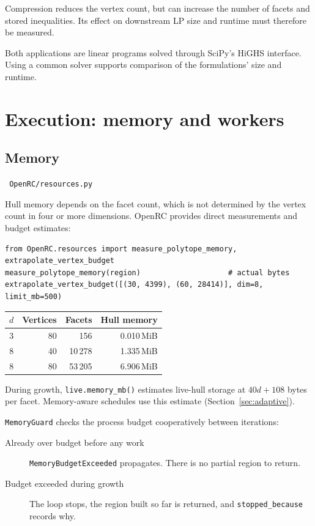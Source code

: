 \documentclass[11pt,a4paper]{report}
\newcommand{\code}[1]{\texttt{\small #1}}
\newcommand{\file}[1]{\texttt{\small\color{nbgrey} #1}}
\begin{document}
Compression reduces the vertex count, but can increase the number of facets
and stored inequalities. Its effect on downstream LP size and runtime must
therefore be measured.

Both applications are linear programs solved through SciPy's HiGHS interface.
Using a common solver supports comparison of the formulations' size and runtime.

\chapter{Execution: memory and workers}
\label{ch:execution}

\section{Memory}

\file{OpenRC/resources.py}

Hull memory depends on the facet count, which is not determined by the vertex
count in four or more dimensions. OpenRC provides direct measurements and
budget estimates:

\begin{lstlisting}
from OpenRC.resources import measure_polytope_memory, extrapolate_vertex_budget
measure_polytope_memory(region)                    # actual bytes
extrapolate_vertex_budget([(30, 4399), (60, 28414)], dim=8, limit_mb=500)
\end{lstlisting}

\begin{center}\small
\begin{tabular}{@{}rrrr@{}}
\toprule
$d$ & Vertices & Facets & Hull memory \\
\midrule
3 & 80 & 156 & 0.010\,MiB \\
8 & 40 & 10\,278 & 1.335\,MiB \\
8 & 80 & 53\,205 & 6.906\,MiB \\
\bottomrule
\end{tabular}
\end{center}

During growth, \code{live.memory\_mb()} estimates live-hull storage at
$40d+108$ bytes per facet. Memory-aware schedules use this estimate
(Section~\ref{sec:adaptive}).

\code{MemoryGuard} checks the process budget cooperatively between iterations:

\begin{description}
\item[Already over budget before any work] \code{MemoryBudgetExceeded}
  propagates. There is no partial region to return.
\item[Budget exceeded during growth] The loop stops, the region built so
  far is returned, and \code{stopped\_because} records why.
\end{description}
\end{document}
